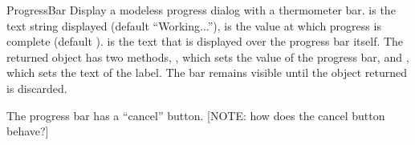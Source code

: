 \begin{funcdesc}{ProgressBar}{}
Display a modeless progress dialog with a thermometer bar. 
is the text string displayed (default ``Working...''),  is
the value at which progress is complete (default
).  is the text that is displayed over the progress
bar itself.  The returned object has two methods,
, which sets the value of the progress bar, and
, which sets the text of the label. The bar
remains visible until the object returned is discarded.

The progress bar has a ``cancel'' button. [NOTE: how does the cancel
button behave?]
\end{funcdesc}
